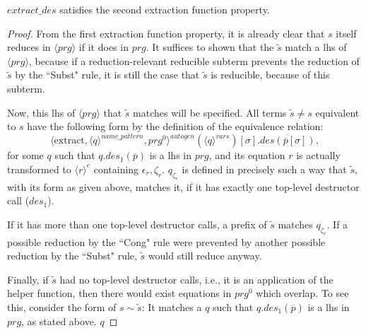 \begin{lemma}

$extract\_des$ satisfies the second extraction function property.

\begin{proof}

From the first extraction function property, it is already clear that $s$ itself reduces in $\langle prg \rangle$ if it does in $prg$. It suffices to shown that the $\widetilde{s}$ match a lhs of $\langle prg \rangle$, because if a reduction-relevant reducible subterm prevents the reduction of $\widetilde{s}$ by the ``Subst" rule, it is still the case that $\widetilde{s}$ is reducible, because of this subterm.

Now, this lhs of $\langle prg \rangle$ that $\widetilde{s}$ matches will be specified. All terms $\widetilde{s} \neq s$ equivalent to $s$ have the following form by the definition of the equivalence relation:
\begin{equation*}
\langle \textrm{extract}, \langle q \rangle^{name\_pattern}, prg^0 \rangle^{autogen}(\langle q \rangle^{vars})[\sigma].\overline{des(\overline{p}[\sigma])},
\end{equation*}
for some $q$ such that $q.des_1(\overline{p})$ is a lhs in $prg$, and its equation $r$ is actually transformed to $\langle r \rangle^e$ containing $\epsilon_r, \zeta_r$. $q_{\zeta_r}$ is defined in precisely such a way that $\widetilde{s}$, with its form as given above, matches it, if it has exactly one top-level destructor call ($des_1$).

If it has more than one top-level destructor calls, a prefix of $\widetilde{s}$ matches $q_{\zeta_r}$. If a  possible reduction by the ``Cong" rule were prevented by another possible reduction by the ``Subst" rule, $\widetilde{s}$ would still reduce anyway.

Finally, if $\widetilde{s}$ had no top-level destructor calls, i.e., it is an application of the helper function, then there would exist equations in $prg^0$ which overlap. To see this, consider the form of $s \sim \widetilde{s}$: It matches a $q$ such that $q.des_1(\overline{p})$ is a lhs in $prg$, as stated above. $q$ 

\end{proof}

\end{lemma}

